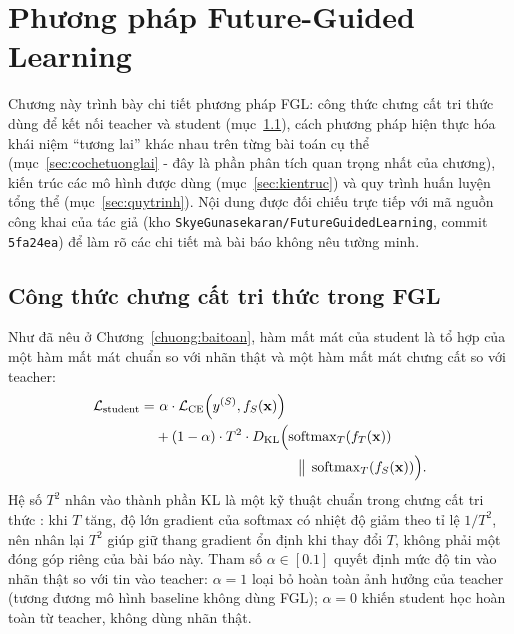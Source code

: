 \chapter{Phương pháp Future-Guided Learning}
\label{chuong:phuongphap}

Chương này trình bày chi tiết phương pháp FGL: công thức chưng cất tri thức dùng để kết nối
teacher và student (mục~\ref{sec:fgl-loss-detail}), cách phương pháp hiện thực hóa khái niệm
``tương lai'' khác nhau trên từng bài toán cụ thể (mục~\ref{sec:cochetuonglai} - đây là phần
phân tích quan trọng nhất của chương), kiến trúc các mô hình được dùng
(mục~\ref{sec:kientruc}) và quy trình huấn luyện tổng thể (mục~\ref{sec:quytrinh}). Nội dung
được đối chiếu trực tiếp với mã nguồn công khai của tác giả (kho
\texttt{SkyeGunasekaran/FutureGuidedLearning}, commit \texttt{5fa24ea}) để làm rõ các chi tiết
mà bài báo không nêu tường minh.

\section{Công thức chưng cất tri thức trong FGL}
\label{sec:fgl-loss-detail}

Như đã nêu ở Chương~\ref{chuong:baitoan}, hàm mất mát của student là tổ hợp của một hàm mất
mát chuẩn so với nhãn thật và một hàm mất mát chưng cất so với teacher:
\begin{equation}
\begin{split}
	\mathcal{L}_{\text{student}} = &\ \alpha \cdot \mathcal{L}_{\text{CE}}\!\left(y^{(S)}, f_S(\mathbf{x})\right) \\
	&+ (1-\alpha) \cdot T^2 \cdot D_{\mathrm{KL}}\Bigl(\operatorname{softmax}_T\!\left(f_T(\mathbf{x})\right) \\
	&\hspace{3.6cm} \big\|\; \operatorname{softmax}_T\!\left(f_S(\mathbf{x})\right)\Bigr).
\end{split}
	\label{eq:fgl-loss-ch3}
\end{equation}
Hệ số $T^2$ nhân vào thành phần KL là một kỹ thuật chuẩn trong chưng cất tri thức
\cite{hinton2015distillation}: khi $T$ tăng, độ lớn gradient của softmax có nhiệt độ giảm theo
tỉ lệ $1/T^2$, nên nhân lại $T^2$ giúp giữ thang gradient ổn định khi thay đổi $T$, không phải
một đóng góp riêng của bài báo này. Tham số $\alpha \in [0.1]$ quyết định mức độ tin vào nhãn
thật so với tin vào teacher: $\alpha = 1$ loại bỏ hoàn toàn ảnh hưởng của teacher (tương đương
mô hình baseline không dùng FGL); $\alpha = 0$ khiến student học hoàn toàn từ teacher, không
dùng nhãn thật.

